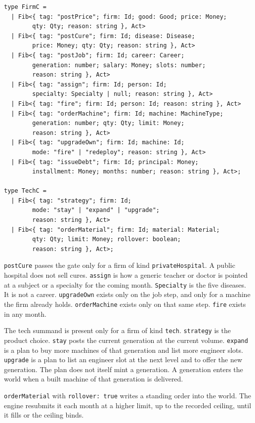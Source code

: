 \documentclass[11pt]{article}
\newenvironment{keep}{\noindent\begin{minipage}{\linewidth}}{\end{minipage}}
\begin{document}
\begin{keep}
\begin{lstlisting}
type FirmC =
  | Fib<{ tag: "postPrice"; firm: Id; good: Good; price: Money;
        qty: Qty; reason: string }, Act>
  | Fib<{ tag: "postCure"; firm: Id; disease: Disease;
        price: Money; qty: Qty; reason: string }, Act>
  | Fib<{ tag: "postJob"; firm: Id; career: Career;
        generation: number; salary: Money; slots: number;
        reason: string }, Act>
  | Fib<{ tag: "assign"; firm: Id; person: Id;
        specialty: Specialty | null; reason: string }, Act>
  | Fib<{ tag: "fire"; firm: Id; person: Id; reason: string }, Act>
  | Fib<{ tag: "orderMachine"; firm: Id; machine: MachineType;
        generation: number; qty: Qty; limit: Money;
        reason: string }, Act>
  | Fib<{ tag: "upgradeOwn"; firm: Id; machine: Id;
        mode: "fire" | "redeploy"; reason: string }, Act>
  | Fib<{ tag: "issueDebt"; firm: Id; principal: Money;
        installment: Money; months: number; reason: string }, Act>;

type TechC =
  | Fib<{ tag: "strategy"; firm: Id;
        mode: "stay" | "expand" | "upgrade";
        reason: string }, Act>
  | Fib<{ tag: "orderMaterial"; firm: Id; material: Material;
        qty: Qty; limit: Money; rollover: boolean;
        reason: string }, Act>;
\end{lstlisting}
\end{keep}

\texttt{postCure} passes the gate only for a firm of kind
\texttt{privateHospital}. A public hospital does not sell cures.
\texttt{assign} is how a generic teacher or doctor is pointed at a subject
or a specialty for the coming month. \texttt{Specialty} is the five diseases.
It is not a career. \texttt{upgradeOwn} exists only on the job step, and only
for a machine the firm already holds. \texttt{orderMachine} exists only on
that same step. \texttt{fire} exists in any month.

The tech summand is present only for a firm of kind \texttt{tech}.
\texttt{strategy} is the product choice. \texttt{stay} posts the current
generation at the current volume. \texttt{expand} is a plan to buy more
machines of that generation and list more engineer slots.
\texttt{upgrade} is a plan to list an engineer slot at the next level and to
offer the new generation. The plan does not itself mint a generation. A
generation enters the world when a built machine of that generation is
delivered.

\texttt{orderMaterial} with \texttt{rollover: true} writes a standing order
into the world. The engine resubmits it each month at a higher limit, up to
the recorded ceiling, until it fills or the ceiling binds.
\end{document}
